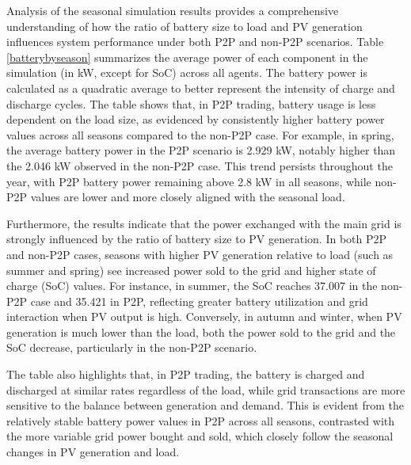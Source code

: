\documentclass[preprint,12pt]{elsarticle}
\begin{document}
Analysis of the seasonal simulation results provides a comprehensive understanding of how the ratio of battery size to load and PV generation influences system performance under both P2P and non-P2P scenarios. Table \ref{batterybyseason} summarizes the average power of each component in the simulation (in kW, except for SoC) across all agents. The battery power is calculated as a quadratic average to better represent the intensity of charge and discharge cycles. The table shows that, in P2P trading, battery usage is less dependent on the load size, as evidenced by consistently higher battery power values across all seasons compared to the non-P2P case. For example, in spring, the average battery power in the P2P scenario is 2.929 kW, notably higher than the 2.046 kW observed in the non-P2P case. This trend persists throughout the year, with P2P battery power remaining above 2.8 kW in all seasons, while non-P2P values are lower and more closely aligned with the seasonal load.

Furthermore, the results indicate that the power exchanged with the main grid is strongly influenced by the ratio of battery size to PV generation. In both P2P and non-P2P cases, seasons with higher PV generation relative to load (such as summer and spring) see increased power sold to the grid and higher state of charge (SoC) values. For instance, in summer, the SoC reaches 37.007 in the non-P2P case and 35.421 in P2P, reflecting greater battery utilization and grid interaction when PV output is high. Conversely, in autumn and winter, when PV generation is much lower than the load, both the power sold to the grid and the SoC decrease, particularly in the non-P2P scenario.

The table also highlights that, in P2P trading, the battery is charged and discharged at similar rates regardless of the load, while grid transactions are more sensitive to the balance between generation and demand. This is evident from the relatively stable battery power values in P2P across all seasons, contrasted with the more variable grid power bought and sold, which closely follow the seasonal changes in PV generation and load.
\end{document}
